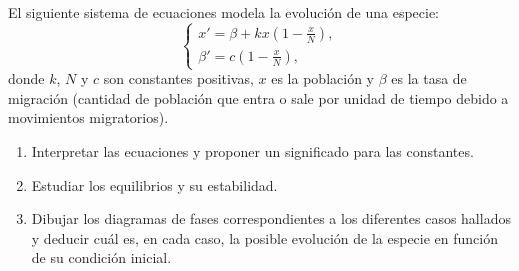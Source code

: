 \documentclass[11pt]{report}
\begin{document}
\begin{exercise}
    El siguiente sistema de ecuaciones modela la evolución de una especie:
    \[\begin{cases}
        x' = \beta + kx(1-\frac{x}{N}), \\
        \beta' = c(1-\frac{x}{N}),
    \end{cases}\]
    donde $k$, $N$ y $c$ son constantes positivas, $x$ es la población y $\beta$ es la tasa de migración (cantidad de población que entra o sale por unidad de tiempo debido a movimientos migratorios).
    \begin{enumerate}
        \item Interpretar las ecuaciones y proponer un significado para las constantes.
        \item Estudiar los equilibrios y su estabilidad.
        \item Dibujar los diagramas de fases correspondientes a los diferentes casos hallados y deducir cuál es, en cada caso, la posible evolución de la especie en función de su condición inicial.
    \end{enumerate}
\end{exercise}
\end{document}
